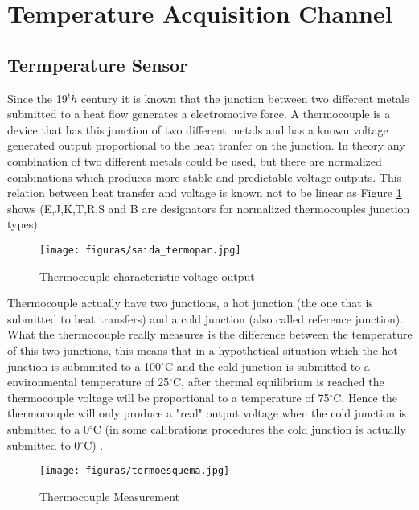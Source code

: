 \section{Temperature Acquisition Channel}
			
	\subsection{Termperature Sensor}
	
		Since the 19$^th$ century it is known that the junction between two different metals submitted to a heat flow generates a electromotive force. A thermocouple is a device that has this junction of two different metals and has a known voltage generated output proportional to the heat tranfer on the junction. In theory any combination of two different metals could be used, but there are normalized combinations which produces more stable and predictable voltage outputs. \cite{pollock1991thermocouples} This relation between heat transfer and voltage is known not to be linear as Figure \ref{fig-thermocoupleVoltage} shows (E,J,K,T,R,S and B are designators for normalized thermocouples junction types).

		\begin{figure}[htbp]
			\centering
				\texttt{[image: figuras/saida\_termopar.jpg]}
			\caption{Thermocouple characteristic voltage output \cite{termo-curves}}
			\label{fig-thermocoupleVoltage}
		\end{figure}
		
		Thermocouple actually have two junctions, a hot junction (the one that is submitted to heat transfers) and a cold junction (also called reference junction). What the thermocouple really measures is the difference between the temperature of this two junctions, this means that in a hypothetical situation which the hot junction is submmited to a 100$^{\circ}$C and the cold junction is submitted to a environmental temperature of 25$^{\circ}$C, after thermal equilibrium is reached the thermocouple voltage will be proportional to a temperature of 75$^{\circ}$C. Hence the thermocouple will only produce a "real" output voltage when the cold junction is submitted to a 0$^{\circ}$C (in some calibrations procedures the cold junction is actually submitted to 0$^{\circ}$C) \cite{kinzie1973thermocouple}.
		
		\begin{figure}[htbp]
			\centering
				\texttt{[image: figuras/termoesquema.jpg]}
			\caption{Thermocouple Measurement \cite{termo-med}}
			\label{fig-thermocoupleMeasurement}
		\end{figure}
		
